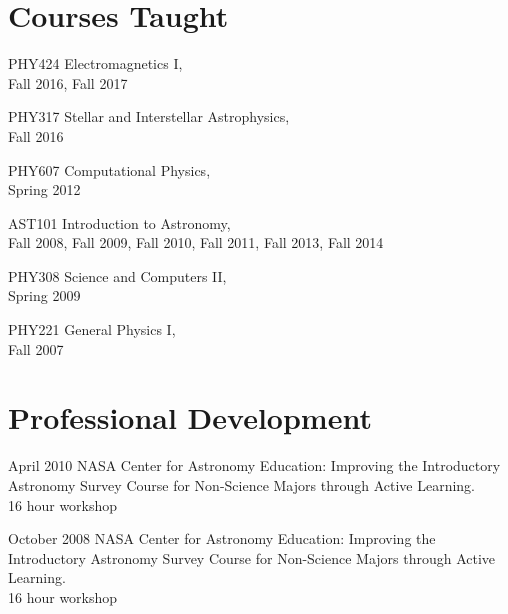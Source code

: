 \documentclass{cv}
\begin{document}
\section{Courses Taught}
\begin{entry}
\item[PHY424] {Electromagnetics I},\\
{\small Fall 2016, Fall 2017}

\item[PHY317] {Stellar and Interstellar Astrophysics},\\
{\small Fall 2016}

\item[PHY607] {Computational Physics},\\
{\small Spring 2012}

\item[AST101] {Introduction to Astronomy},\\
{\small Fall 2008, Fall 2009, Fall 2010, Fall 2011, Fall 2013, Fall 2014}

\item[PHY308] {Science and Computers II},\\
{\small Spring 2009}

\item[PHY221] {General Physics I},\\
{\small Fall 2007}
\end{entry}



\section{Professional Development}
\begin{entry}
\item[April 2010] {NASA Center for Astronomy Education: Improving the
Introductory Astronomy Survey Course for Non-Science Majors through Active
Learning.}\\
{\small 16 hour workshop}\\
\item[October 2008] {NASA Center for Astronomy Education: Improving the
Introductory Astronomy Survey Course for Non-Science Majors through Active
Learning.}\\
{\small 16 hour workshop}
\end{entry}
\end{document}

